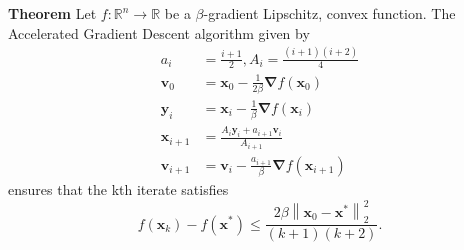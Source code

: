 \textbf{Theorem} Let $f: \mathbb{R}^{n} \rightarrow \mathbb{R}$ be a $\beta$-gradient Lipschitz, convex function. 
The Accelerated Gradient Descent algorithm given by
$$
\begin{aligned}
a_{i} &=\frac{i+1}{2}, A_{i}=\frac{(i+1)(i+2)}{4} \\
\boldsymbol{v}_{0} &=\boldsymbol{x}_{0}-\frac{1}{2 \beta} \boldsymbol{\nabla} f\left(\boldsymbol{x}_{0}\right) \\
\boldsymbol{y}_{i} &=\boldsymbol{x}_{i}-\frac{1}{\beta} \boldsymbol{\nabla} f\left(\boldsymbol{x}_{i}\right) \\
\boldsymbol{x}_{i+1} &=\frac{A_{i} \boldsymbol{y}_{i}+a_{i+1} \boldsymbol{v}_{i}}{A_{i+1}} \\
\boldsymbol{v}_{i+1} &=\boldsymbol{v}_{i}-\frac{a_{i+1}}{\beta} \boldsymbol{\nabla} f\left(\boldsymbol{x}_{i+1}\right)
\end{aligned}
$$
ensures that the kth iterate satisfies
$$
f\left(\boldsymbol{x}_{k}\right)-f\left(\boldsymbol{x}^{*}\right) \leq \frac{2 \beta\left\|\boldsymbol{x}_{0}-\boldsymbol{x}^{*}\right\|_{2}^{2}}{(k+1)(k+2)} .
$$

